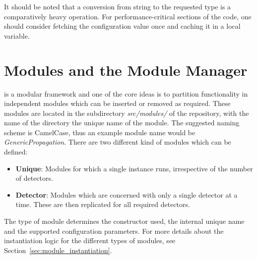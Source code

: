 \begin{warning}
    It should be noted that a conversion from string to the requested type is a comparatively heavy operation.
    For performance-critical sections of the code, one should consider fetching the configuration value once and caching it in a local variable.
\end{warning}

\section{Modules and the Module Manager}
\label{sec:module_manager}
\apsq is a modular framework and one of the core ideas is to partition functionality in independent modules which can be inserted or removed as required.
These modules are located in the subdirectory \textit{src/modules/} of the repository, with the name of the directory the unique name of the module.
The suggested naming scheme is CamelCase, thus an example module name would be \textit{GenericPropagation}.
There are two different kind of modules which can be defined:
\begin{itemize}
    \item \textbf{Unique}: Modules for which a single instance runs, irrespective of the number of detectors.
    \item \textbf{Detector}: Modules which are concerned with only a single detector at a time.
    These are then replicated for all required detectors.
\end{itemize}
The type of module determines the constructor used, the internal unique name and the supported configuration parameters.
For more details about the instantiation logic for the different types of modules, see Section~\ref{sec:module_instantiation}.


